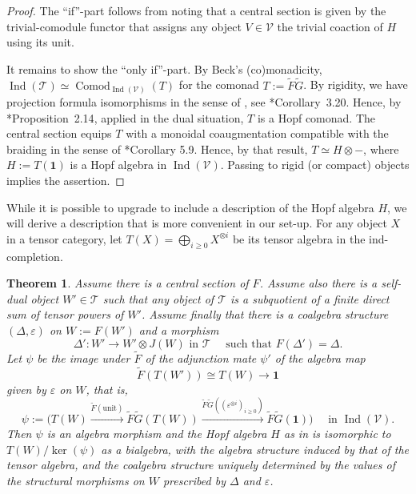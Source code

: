 \documentclass[11pt]{amsart}
\newcommand\Cref[1]{\zcref[S]{#1}}
\newtheorem{theorem}{Theorem}[section]
\theoremstyle{definition}
\theoremstyle{remark}
\newcommand\cT{\mathcal T}
\newcommand\cV{\mathcal V}
\newcommand\Ind{\operatorname{Ind}}
\newcommand\Comod{\operatorname{Comod}}
\renewcommand\:\colon
\renewcommand\o\otimes
\newcommand\one{\mathbf{1}}
\renewcommand\o\otimes
\renewcommand\:\colon
\newcommand\eps{\varepsilon}
\begin{document}
\begin{proof} The ``if''-part follows from noting that a central section is given by the trivial-comodule functor that assigns any object $V\in\cV$ the trivial coaction of $H$ using its unit.

It remains to show the ``only if''-part. By Beck's (co)monadicity, $\Ind(\cT)\simeq\Comod_{\Ind(\cV)}(T)$ for the comonad $T:=\tilde F \tilde G$. By rigidity, we have projection formula isomorphisms in the sense of \cite{FLP}, see \cite{FLP}*{Corollary~3.20}. Hence, by \cite{BLV}*{Proposition~2.14}, applied in the dual situation, $T$ is a Hopf comonad. The central section equips $T$ with a monoidal coaugmentation compatible with the braiding in the sense of \cite{BLV}*{Corollary 5.9}. Hence, by that result, $T\simeq H\o -$, where $H:=T(\one)$ is a Hopf algebra in $\Ind(\cV)$. Passing to rigid (or compact) objects implies the assertion.
\end{proof}


While it is possible to upgrade \Cref{thm:rec-1} to include a description of the Hopf algebra $H$, we will derive a description that is more convenient in our set-up. For any object $X$ in a tensor category, let $T(X)=\bigoplus_{i\ge0} X^{\o i}$ be its tensor algebra in the ind-completion.

\begin{theorem} \label{thm:rec-2} Assume there is a central section of $F$. Assume also there is a self-dual object $W'\in\cT$ such that any object of $\cT$ is a subquotient of a finite direct sum of tensor powers of $W'$. Assume finally that there is a coalgebra structure $(\Delta,\eps)$ on $W:=F(W')$ and a morphism 
$$
\Delta'\:W'\to W'\o J(W)  \text{ in } \cT
\quad \text{ such that }
F(\Delta')=\Delta .
$$
Let $\psi$ be the image under $\tilde F$ of the adjunction mate $\psi'$ of the algebra map 
$$\tilde F (T(W'))\cong T(W)\to\one$$
given by $\eps$ on $W$, that is,
$$
\psi := \Big( T(W)\xrightarrow{\tilde F(\mathrm{unit})} \tilde F \tilde G (T(W)) \xrightarrow{\tilde F\tilde G((\eps^{\o i})_{i\ge0})} \tilde F\tilde G(\one) \Big)
\quad\text{ in } \Ind(\cV) .
$$
Then $\psi$ is an algebra morphism and the Hopf algebra $H$ as in \Cref{thm:rec-1} is isomorphic to $T(W)/\ker(\psi)$ as a bialgebra, with the algebra structure induced by that of the tensor algebra, and the coalgebra structure uniquely determined by the values of the structural morphisms on $W$ prescribed by $\Delta$ and $\eps$.
\end{theorem}
\end{document}

